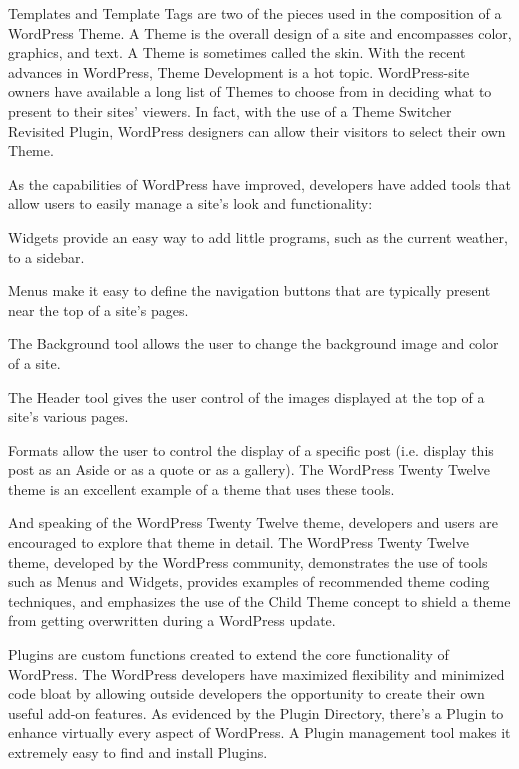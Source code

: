 Templates and Template Tags are two of the pieces used in the composition of a WordPress Theme. A Theme is the overall design of a site and encompasses color, graphics, and text. A Theme is sometimes called the skin. With the recent advances in WordPress, Theme Development is a hot topic. WordPress-site owners have available a long list of Themes to choose from in deciding what to present to their sites' viewers. In fact, with the use of a Theme Switcher Revisited Plugin, WordPress designers can allow their visitors to select their own Theme.

As the capabilities of WordPress have improved, developers have added tools that allow users to easily manage a site's look and functionality:
\begin{compactitem}
\item Widgets provide an easy way to add little programs, such as the current weather, to a sidebar.
\item Menus make it easy to define the navigation buttons that are typically present near the top of a site's pages.
\item The Background tool allows the user to change the background image and color of a site.
\item The Header tool gives the user control of the images displayed at the top of a site's various pages.
\item Formats allow the user to control the display of a specific post (i.e. display this post as an Aside or as a quote or as a gallery). The WordPress Twenty Twelve theme is an excellent example of a theme that uses these tools.
\end{compactitem}

And speaking of the WordPress Twenty Twelve theme, developers and users are encouraged to explore that theme in detail. The WordPress Twenty Twelve theme, developed by the WordPress community, demonstrates the use of tools such as Menus and Widgets, provides examples of recommended theme coding techniques, and emphasizes the use of the Child Theme concept to shield a theme from getting overwritten during a WordPress update.

Plugins are custom functions created to extend the core functionality of WordPress. The WordPress developers have maximized flexibility and minimized code bloat by allowing outside developers the opportunity to create their own useful add-on features. As evidenced by the Plugin Directory, there's a Plugin to enhance virtually every aspect of WordPress. A Plugin management tool makes it extremely easy to find and install Plugins.

